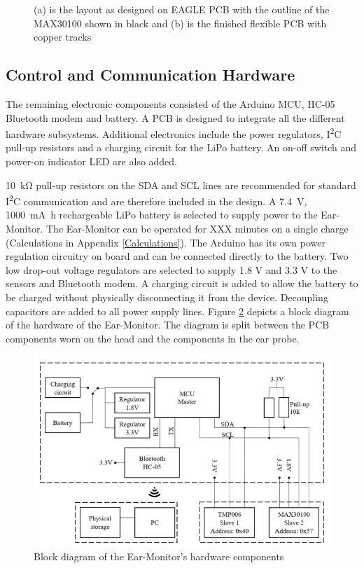 \begin{figure}[H]
\centering
\graphicspath{{figs/}}

\caption{(a) is the layout as designed on EAGLE PCB  with the outline of the MAX30100 shown in black and (b) is the finished flexible PCB with copper tracks}
\label{fig:MAX30100_layout}
\end{figure}

\subsection{Control and Communication Hardware}
The remaining electronic components consisted of the Arduino MCU, HC-05 Bluetooth modem and battery. A PCB is designed to integrate all the different hardware subsystems. Additional electronics include the power regulators, I\textsuperscript{2}C pull-up resistors and a charging circuit for the LiPo battery. An on-off switch and power-on indicator LED are also added. 

\medskip

\SI{10}{\kilo\ohm} pull-up resistors on the SDA and SCL lines are recommended for standard I\textsuperscript{2}C communication and are therefore included in the design. A \SI{7.4}{\volt}, \SI{1000}{\milli\ampere\hour} rechargeable LiPo battery is selected to supply power to the Ear-Monitor. The Ear-Monitor can be operated for XXX minutes on a single charge (Calculations in Appendix \ref{Calculations}). The Arduino has its own power regulation circuitry on board and can be connected directly to the battery. Two low drop-out voltage regulators are selected to supply 1.8 V and 3.3 V to the sensors and Bluetooth modem. A charging circuit is added to allow the battery to be charged without physically disconnecting it from the device. Decoupling capacitors are added to all power supply lines. Figure \ref{fig:Ear-Monitor_BlockDiagram} depicts a block diagram of the hardware of the Ear-Monitor. The diagram is split between the PCB components worn on the head and the components in the ear probe.

\begin{figure}[H]
   \centering
   \includegraphics[scale=0.9]{figs/Ear-Monitor_BlockDiagram.png}
   \caption{Block diagram of the Ear-Monitor's hardware components}
   \label{fig:Ear-Monitor_BlockDiagram}
\end{figure}

